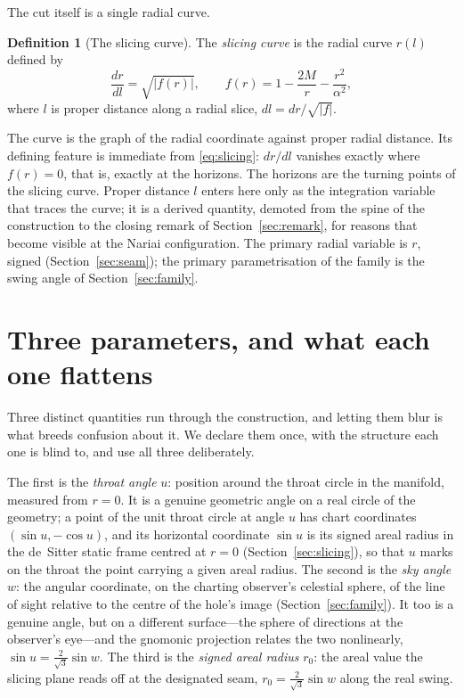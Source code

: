 \documentclass[11pt,a4paper]{article}
\theoremstyle{definition}
\newtheorem{definition}[theorem]{Definition}
\begin{document}
The cut itself is a single radial curve.

\begin{definition}[The slicing curve]\label{def:slicing}
The \emph{slicing curve} is the radial curve $r(l)$ defined by
\begin{equation}\label{eq:slicing}
  \frac{dr}{dl}=\sqrt{\lvert f(r)\rvert},
  \qquad
  f(r)=1-\frac{2M}{r}-\frac{r^{2}}{\alpha^{2}},
\end{equation}
where $l$ is proper distance along a radial slice, $dl=dr/\sqrt{\lvert f\rvert}$.
\end{definition}

The curve is the graph of the radial coordinate against proper radial distance. Its defining feature is immediate from \eqref{eq:slicing}: $dr/dl$ vanishes exactly where $f(r)=0$, that is, exactly at the horizons. The horizons are the turning points of the slicing curve. Proper distance $l$ enters here only as the integration variable that traces the curve; it is a derived quantity, demoted from the spine of the construction to the closing remark of Section~\ref{sec:remark}, for reasons that become visible at the Nariai configuration. The primary radial variable is $r$, signed (Section~\ref{sec:seam}); the primary parametrisation of the family is the swing angle of Section~\ref{sec:family}.

\section{Three parameters, and what each one flattens}\label{sec:params}

Three distinct quantities run through the construction, and letting them blur is what breeds confusion about it. We declare them once, with the structure each one is blind to, and use all three deliberately.

The first is the \emph{throat angle} $u$: position around the throat circle in the manifold, measured from $r=0$. It is a genuine geometric angle on a real circle of the geometry; a point of the unit throat circle at angle $u$ has chart coordinates $(\sin u,-\cos u)$, and its horizontal coordinate $\sin u$ is its signed areal radius in the de~Sitter static frame centred at $r=0$ (Section~\ref{sec:slicing}), so that $u$ marks on the throat the point carrying a given areal radius. The second is the \emph{sky angle} $w$: the angular coordinate, on the charting observer's celestial sphere, of the line of sight relative to the centre of the hole's image (Section~\ref{sec:family}). It too is a genuine angle, but on a different surface---the sphere of directions at the observer's eye---and the gnomonic projection relates the two nonlinearly, $\sin u=\tfrac{2}{\sqrt3}\sin w$. The third is the \emph{signed areal radius} $r_{0}$: the areal value the slicing plane reads off at the designated seam, $r_{0}=\tfrac{2}{\sqrt3}\sin w$ along the real swing.
\end{document}

